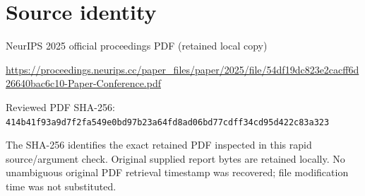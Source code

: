 \documentclass[11pt]{article}
\begin{document}
\section*{Source identity}

NeurIPS 2025 official proceedings PDF (retained local copy)

\url{https://proceedings.neurips.cc/paper_files/paper/2025/file/54df19dc823e2cacff6d26640bac6c10-Paper-Conference.pdf}

Reviewed PDF SHA-256: \nolinkurl{414b41f93a9d7f2fa549e0bd97b23a64fd8ad06bd77cdff34cd95d422c83a323}

The SHA-256 identifies the exact retained PDF inspected in this rapid source/argument check. Original supplied report bytes are retained locally. No unambiguous original PDF retrieval timestamp was recovered; file modification time was not substituted.
\end{document}
